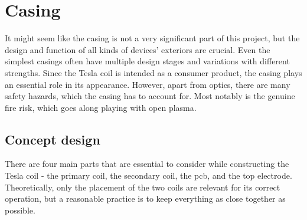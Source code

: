 \chapter{Casing}

It might seem like the casing is not a very significant part of this project, but the design and function of all kinds of devices' exteriors are crucial. Even the simplest casings often have multiple design stages and variations with different strengths. Since the Tesla coil is intended as a consumer product, the casing plays an essential role in its appearance. However, apart from optics, there are many safety hazards, which the casing has to account for. Most notably is the genuine fire risk, which goes along playing with open plasma.


\section{Concept design}
\label{sec:concept-design}

There are four main parts that are essential to consider while constructing the Tesla coil - the primary coil, the secondary coil, the \gls{pcb}, and the top electrode. Theoretically, only the placement of the two coils are relevant for its correct operation, but a reasonable practice is to keep everything as close together as possible.

